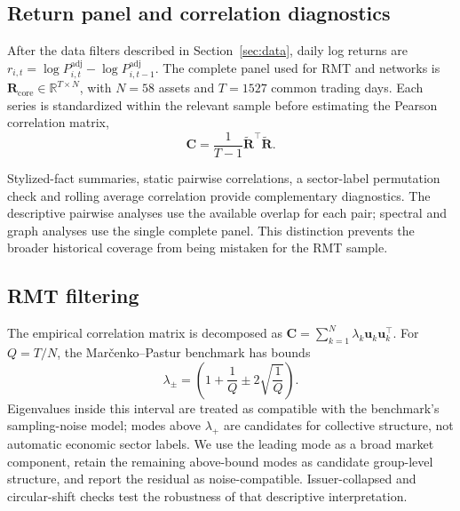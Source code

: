 \subsection{Return panel and correlation diagnostics}
\label{subsec:notation}

After the data filters described in Section~\ref{sec:data}, daily log returns are $r_{i,t}=\log P^{\mathrm{adj}}_{i,t}-\log P^{\mathrm{adj}}_{i,t-1}$. The complete panel used for RMT and networks is $\mathbf{R}_{\mathrm{core}}\in\mathbb{R}^{T\times N}$, with $N=58$ assets and $T=1527$ common trading days. Each series is standardized within the relevant sample before estimating the Pearson correlation matrix,
\begin{equation}
\mathbf{C}=\frac{1}{T-1}\widetilde{\mathbf{R}}^{\top}\widetilde{\mathbf{R}}.
\end{equation}
\label{subsec:asset_filtering}

Stylized-fact summaries, static pairwise correlations, a sector-label permutation check and rolling average correlation provide complementary diagnostics. The descriptive pairwise analyses use the available overlap for each pair; spectral and graph analyses use the single complete panel. This distinction prevents the broader historical coverage from being mistaken for the RMT sample.
\label{subsec:stylized_method}
\label{subsec:correlation_method}
\label{subsec:sectoral_method}
\label{subsec:rolling_corr_method}

\subsection{RMT filtering}
\label{subsec:rmt_method}

The empirical correlation matrix is decomposed as $\mathbf{C}=\sum_{k=1}^{N}\lambda_k\mathbf{u}_k\mathbf{u}_k^{\top}$. For $Q=T/N$, the Mar\v{c}enko--Pastur benchmark has bounds
\begin{equation}
\lambda_{\pm}=\left(1+\frac{1}{Q}\pm2\sqrt{\frac{1}{Q}}\right).
\end{equation}
Eigenvalues inside this interval are treated as compatible with the benchmark's sampling-noise model; modes above $\lambda_+$ are candidates for collective structure, not automatic economic sector labels. We use the leading mode as a broad market component, retain the remaining above-bound modes as candidate group-level structure, and report the residual as noise-compatible. Issuer-collapsed and circular-shift checks test the robustness of that descriptive interpretation.

